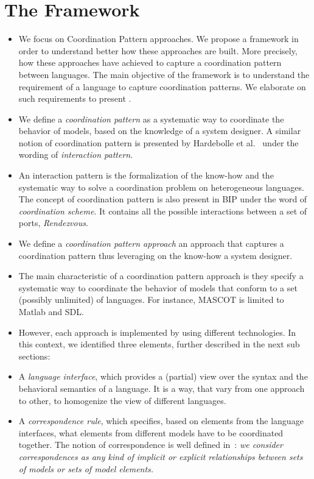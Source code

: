\section{The Framework}
\begin{itemize}
	\item We focus on Coordination Pattern approaches. We propose a framework in order to understand better how these approaches are built. More precisely, how these approaches have achieved to capture a coordination pattern between languages. The main objective of the framework is to understand the requirement of a language to capture coordination patterns. We elaborate on such requirements to present \bcool. 


	\item We define a \emph{coordination pattern} as a systematic way to coordinate the behavior of models, based on the knowledge of a system designer. A similar notion of coordination pattern is presented by Hardebolle et al.~\cite{hardebollethese} under the wording of \emph{interaction pattern}. 
	\item An interaction pattern is the formalization of the know-how and the systematic way to solve a coordination problem on heterogeneous languages. The concept of coordination pattern is also present in BIP under the word of \emph{coordination scheme}. It contains all the possible interactions between a set of ports, \eg \emph{Rendezvous}.
	
	\item We define a \emph{coordination pattern approach} an approach that captures a coordination pattern thus leveraging on the know-how a system designer. 
	\item The main characteristic of a coordination pattern approach is they specify a systematic way to coordinate the behavior of models that conform to a set (possibly unlimited) of languages. For instance, MASCOT is limited to Matlab and SDL. 
	  
	\item However, each approach is implemented by using different technologies. In this context, we identified three elements, further described in the next sub sections:  
		
		\item A \emph{language interface}, which provides a (partial) view over the syntax and the behavioral semantics of a language. It is a way, that vary from one approach to other, to homogenize the view of different languages.
		
		\item A \emph{correspondence rule}, which specifies, based on elements from the language interfaces, what elements from different models have to be coordinated together. The notion of correspondence is well defined in~\cite{clavreulmodelcompo}: \emph{we consider correspondences as any kind of implicit or explicit relationships between sets of models or sets of model elements.} 
	

\end{itemize}
